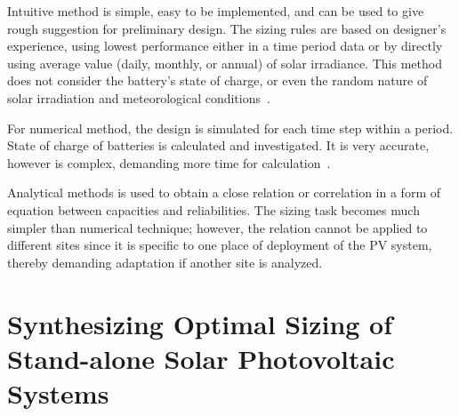 \documentclass[review]{elsarticle}
\begin{document}
Intuitive method is simple, easy to be implemented, and can be used to give 
rough suggestion for preliminary design. The sizing rules are based on designer's experience, 
using lowest performance either in a time period data or by directly using average value 
(daily, monthly, or annual) of solar irradiance. This method does not consider the battery's 
state of charge, or even the random nature of solar irradiation and meteorological conditions~\cite{Alsadi2018}.

For numerical method, the design is simulated for each time step within a period. 
State of charge of batteries is calculated and investigated. It is very accurate, 
however is complex, demanding more time for calculation~\cite{Park2004}.

Analytical methods is used to obtain a close relation or correlation in a form 
of equation between capacities and reliabilities. The sizing task becomes much simpler 
than numerical technique; however, the relation cannot be applied to different sites
since it is specific to one place of deployment of the PV system, 
thereby demanding adaptation if another site is analyzed.

\section{Synthesizing Optimal Sizing of Stand-alone Solar Photovoltaic Systems}
\label{sec:Method}
\end{document}
